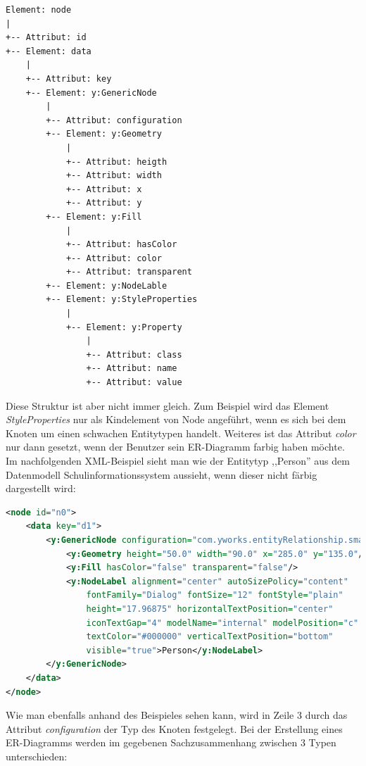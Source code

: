 \begin{verbatim}
Element: node
|
+-- Attribut: id
+-- Element: data
    |
    +-- Attribut: key
    +-- Element: y:GenericNode
        |
        +-- Attribut: configuration
        +-- Element: y:Geometry
            |
            +-- Attribut: heigth
            +-- Attribut: width
            +-- Attribut: x
            +-- Attribut: y
        +-- Element: y:Fill
            |
            +-- Attribut: hasColor
            +-- Attribut: color
            +-- Attribut: transparent
        +-- Element: y:NodeLable
        +-- Element: y:StyleProperties
            |
            +-- Element: y:Property
                |
                +-- Attribut: class
                +-- Attribut: name
                +-- Attribut: value
\end{verbatim}
\prc

\noindent
Diese Struktur ist aber nicht immer gleich. Zum Beispiel wird das Element \textit{StyleProperties} nur als Kindelement von Node angeführt, wenn es sich bei dem Knoten um einen schwachen Entitytypen handelt. Weiteres ist das Attribut \textit{color} nur dann gesetzt, wenn der Benutzer sein ER-Diagramm farbig haben möchte. 
\\

\noindent
Im nachfolgenden XML-Beispiel sieht man wie der Entitytyp ,,Person'' aus dem Datenmodell Schulinformationssystem aussieht, wenn dieser nicht färbig dargestellt wird:

\begin{lstlisting}[language=XML, caption=Entitytyp Person dargestellt in GraphML, label={xmlTypen}]
<node id="n0">
	<data key="d1">
		<y:GenericNode configuration="com.yworks.entityRelationship.small_entity">
			<y:Geometry height="50.0" width="90.0" x="285.0" y="135.0"/>
			<y:Fill hasColor="false" transparent="false"/>
			<y:NodeLabel alignment="center" autoSizePolicy="content"
				fontFamily="Dialog" fontSize="12" fontStyle="plain"
				height="17.96875" horizontalTextPosition="center"
				iconTextGap="4" modelName="internal" modelPosition="c"
				textColor="#000000" verticalTextPosition="bottom"
				visible="true">Person</y:NodeLabel>
		</y:GenericNode>
	</data>
</node>
\end{lstlisting} 

\noindent
Wie man ebenfalls anhand des Beispieles sehen kann, wird in Zeile 3 durch das Attribut \textit{configuration} der Typ des Knoten festgelegt. Bei der Erstellung eines ER-Diagramms werden im gegebenen Sachzusammenhang zwischen 3 Typen unterschieden:
\\

